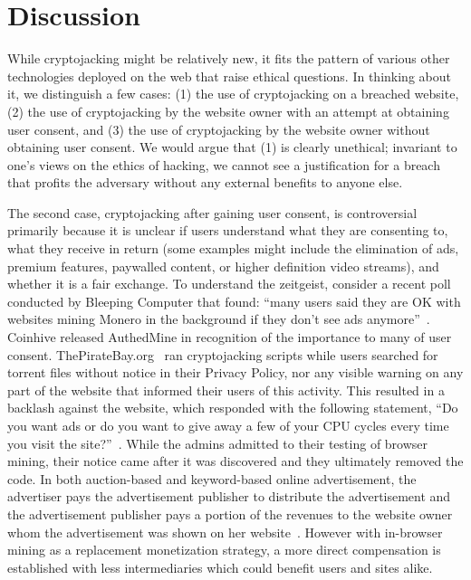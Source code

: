 
\section{Discussion}
\label{sec:ethics}

While cryptojacking might be relatively new, it fits the pattern of various other technologies deployed on the web that raise ethical questions. In thinking about it, we distinguish a few cases: (1) the use of cryptojacking on a breached website, (2) the use of cryptojacking by the website owner with an attempt at obtaining user consent, and (3) the use of cryptojacking by the website owner without obtaining user consent. We would argue that (1) is clearly unethical; invariant to one's views on the ethics of hacking, we cannot see a justification for a breach that profits the adversary without any external benefits to anyone else.

The second case, cryptojacking after gaining user consent, is controversial primarily because it is unclear if users understand what they are consenting to, what they receive in return (some examples might include the elimination of ads, premium features, paywalled content, or higher definition video streams), and whether it is a fair exchange. To understand the zeitgeist, consider a recent poll conducted by Bleeping Computer that found: ``many users said they are OK with websites mining Monero in the background if they don't see ads anymore''~\cite{bleepingcomputerminers}. Coinhive released AuthedMine in recognition of the importance to many of user consent. ThePirateBay.org~\cite{bbcmintcrypto} ran cryptojacking scripts while users searched for torrent files without notice in their Privacy Policy, nor any visible warning on any part of the website that informed their users of this activity. This resulted in a backlash against the website, which responded with the following statement, ``Do you want ads or do you want to give away a few of your CPU cycles every time you visit the site?''~\cite{piratesbayblog}. While the admins admitted to their testing of browser mining, their notice came after it was discovered and they ultimately removed the code. In both auction-based and keyword-based online advertisement, the advertiser pays the advertisement publisher to distribute the advertisement and the advertisement publisher pays a portion of the revenues to the website owner whom the advertisement was shown on her website~\cite{king2007internet}. However with in-browser mining as a replacement monetization strategy, a more direct compensation is established with less intermediaries which could benefit users and sites alike. 

